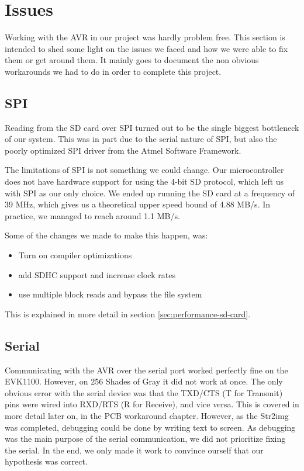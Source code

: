 \section{Issues}

Working with the AVR in our project was hardly problem free. This section is intended to shed some light on the issues we faced and how we were able to fix them or get around them. It mainly goes to document the non obvious workarounds we had to do in order to complete this project.

\subsection{SPI}
\label{sec:avr-spi-issues}
Reading from the \ac{SD} card over \ac{SPI} turned out to be the single biggest
bottleneck of our system. This was in part due to the serial nature of \ac{SPI},
but also the poorly optimized \ac{SPI} driver from the Atmel Software Framework.

The limitations of \ac{SPI} is not something we could change. Our
microcontroller does not have hardware support for using the 4-bit \ac{SD}
protocol, which left us with \ac{SPI} as our only choice. We ended up running
the \ac{SD} card at a frequency of 39 MHz, which gives us a theoretical upper
speed bound of 4.88 MB/s. In practice, we managed to reach around 1.1 MB/s.

Some of the changes we made to make this happen, was: \vspace{-1.0em}
\begin{itemize}
  \item Turn on compiler optimizations \vspace{-1.0em}
  \item add SDHC support and increase clock rates\vspace{-1.0em}
  \item use multiple block reads and bypass the file system
\end{itemize}

This is explained in more detail in section \ref{sec:performance-sd-card}.

\subsection{Serial}
\label{sec:avr-serial-issues}
Communicating with the AVR over the serial port worked perfectly fine on the
EVK1100. However, on 256 Shades of Gray it did not work at once. The
only obvious error with the serial device was that the TXD/CTS (T for Transmit)
pins were wired into RXD/RTS (R for Receive), and vice versa. This is covered 
in more detail later on, in the PCB workaround chapter. However, 
as the Str2img was completed, debugging could be done by writing text to screen.
As debugging was the main purpose of the serial communication, we did not prioritize
fixing the serial. In the end, we only made it work to convince ourself 
that our hypothesis was correct.
